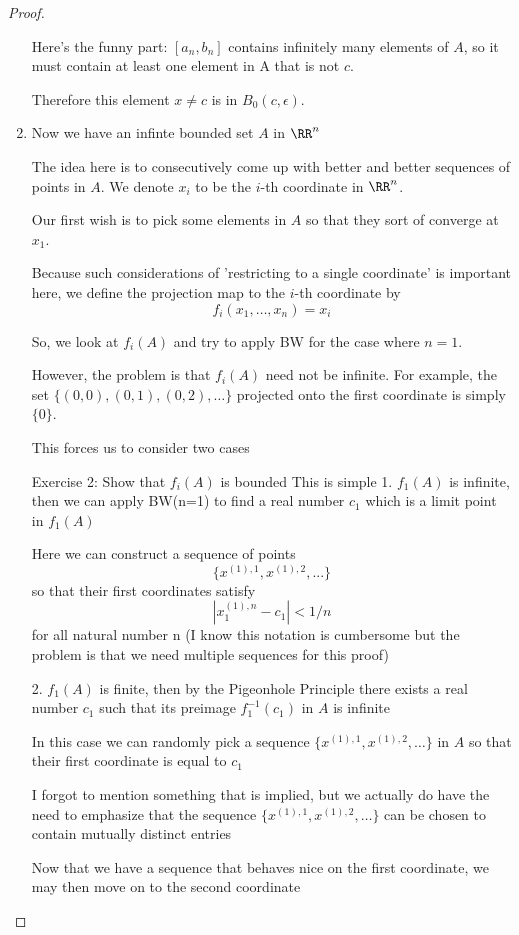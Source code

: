 \begin{proof}
\begin{enumerate}[label=(\alph*)]
Here's the funny part: $[a_n,b_n]$ contains infinitely many elements of $A$, so it must contain at least one element in A that is not $c$.

Therefore this element $x \neq c$ is in $B_0(c,\epsilon)$.

\item Now we have an infinte bounded set $A$ in $\RR^n$

The idea here is to consecutively come up with better and better sequences of points in $A$. We denote $x_i$ to be the $i$-th coordinate in $\RR^n$.

Our first wish is to pick some elements in $A$ so that they sort of converge at $x_1$.

Because such considerations of 'restricting to a single coordinate' is important here, we define the projection map to the $i$-th coordinate by
\[ f_i(x_1,\dots,x_n)=x_i \]

So, we look at $f_i(A)$ and try to apply BW for the case where $n=1$.

However, the problem is that $f_i(A)$ need not be infinite. For example, the set $\{(0,0),(0,1),(0,2),\dots\}$ projected onto the first coordinate is simply $\{0\}$.

This forces us to consider two cases

Exercise 2: Show that $f_i(A)$ is bounded
This is simple
1. $f_1(A)$ is infinite, then we can apply BW(n=1) to find a real number $c_1$ which is a limit point in $f_1(A)$

Here we can construct a sequence of points 
\[ \{x^{(1),1},x^{(1),2},...\} \]
so that their first coordinates satisfy
\[ |x^{(1),n}_1-c_1| < 1/n \]
for all natural number n
(I know this notation is cumbersome but the problem is that we need multiple sequences for this proof)

2. $f_1(A)$ is finite, then by the Pigeonhole Principle there exists a real number $c_1$ such that its preimage $f_1^{-1}(c_1)$ in $A$ is infinite

In this case we can randomly pick a sequence $\{x^{(1),1},x^{(1),2},\dots\}$ in $A$ so that their first coordinate is equal to $c_1$

I forgot to mention something that is implied, but we actually do have the need to emphasize that the sequence $\{x^{(1),1},x^{(1),2},\dots\}$ can be chosen to contain mutually distinct entries

Now that we have a sequence that behaves nice on the first coordinate, we may then move on to the second coordinate


\end{enumerate}
\end{proof}

